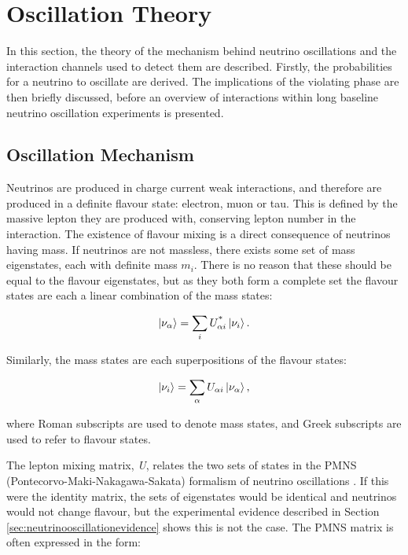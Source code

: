 \section{Oscillation Theory}\label{sec:oscillationtheory}

In this section, the theory of the mechanism behind neutrino oscillations and the interaction channels used to detect them are described. Firstly, the probabilities for a neutrino to oscillate are derived. The implications of the \CP violating phase are then briefly discussed, before an overview of interactions within long baseline neutrino oscillation experiments is presented.

\subsection{Oscillation Mechanism}

Neutrinos are produced in charge current weak interactions, and therefore are produced in a definite flavour state: electron, muon or tau. This is defined by the massive lepton they are produced with, conserving lepton number in the interaction. The existence of flavour mixing is a direct consequence of neutrinos having mass. If neutrinos are not massless, there exists some set of mass eigenstates, each with definite mass $m_i$. There is no reason that these should be equal to the flavour eigenstates, but as they both form a complete set the flavour states are each a linear combination of the mass states:

\begin{equation}
\ket{\nu_{\alpha}} = \sum_{i} U^{\text{*}}_{\alpha i} \ket{\nu_{i}}.
\end{equation}

Similarly, the mass states are each superpositions of the flavour states: 

\begin{equation}
\ket{\nu_{i}} = \sum_{\alpha} U_{\alpha i} \ket{\nu_{\alpha}},
\label{eqn:lincomb}
\end{equation}

where Roman subscripts are used to denote mass states, and Greek subscripts are used to refer to flavour states.

The lepton mixing matrix, \textit{U}, relates the two sets of states in the PMNS (Pontecorvo-Maki-Nakagawa-Sakata) formalism of neutrino oscillations \cite{pmns}. If this were the identity matrix, the sets of eigenstates would be identical and neutrinos would not change flavour, but the experimental evidence described in Section \ref{sec:neutrinooscillationevidence} shows this is not the case. The PMNS matrix is often expressed in the form:

